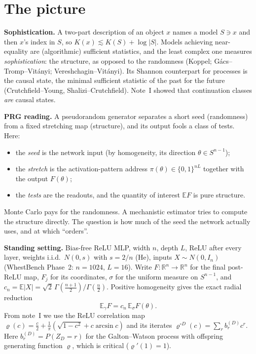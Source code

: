 \documentclass[11pt]{article}
\theoremstyle{definition}
\theoremstyle{remark}
\newcommand{\R}{\mathbb R}
\newcommand{\E}{\mathbb E}
\begin{document}
\tableofcontents

\section{The picture}\label{sec:picture}

\textbf{Sophistication.} A two-part description of an object $x$ names a model $S\ni x$ and then $x$'s index in $S$, so $K(x)\lesssim K(S)+\log|S|$. Models achieving near-equality are (algorithmic) sufficient statistics, and the least complex one measures \emph{sophistication}: the structure, as opposed to the randomness (Koppel; G\'acs--Tromp--Vit\'anyi; Vereshchagin--Vit\'anyi). Its Shannon counterpart for processes is the causal state, the minimal sufficient statistic of the past for the future (Crutchfield--Young, Shalizi--Crutchfield). Note~I showed that continuation classes \emph{are} causal states.

\textbf{PRG reading.} A pseudorandom generator separates a short seed (randomness) from a fixed stretching map (structure), and its output fools a class of tests. Here:
\begin{itemize}
\item the \emph{seed} is the network input (by homogeneity, its direction $\theta\in S^{n-1}$);
\item the \emph{stretch} is the activation-pattern address $\pi(\theta)\in\{0,1\}^{nL}$ together with the output $F(\theta)$;
\item the \emph{tests} are the readouts, and the quantity of interest $\E F$ is pure structure.
\end{itemize}
Monte Carlo pays for the randomness. A mechanistic estimator tries to compute the structure directly. The question is how much of the seed the network actually uses, and at which ``orders''.

\textbf{Standing setting.} Bias-free ReLU MLP, width $n$, depth $L$, ReLU after every layer, weights i.i.d.\ $N(0,s)$ with $s=2/n$ (He), inputs $X\sim N(0,I_n)$ (WhestBench Phase~2: $n=1024$, $L=16$). Write $F:\R^n\to\R^n$ for the final post-ReLU map, $F_j$ for its coordinates, $\sigma$ for the uniform measure on $S^{n-1}$, and $c_n=\E|X|=\sqrt2\,\Gamma(\tfrac{n+1}2)/\Gamma(\tfrac n2)$. Positive homogeneity gives the exact radial reduction
\begin{equation}\label{eq:radial}
\E_\gamma F=c_n\,\E_\sigma F(\theta).
\end{equation}
From note~I we use the ReLU correlation map $\varrho(c)=\frac c2+\frac1\pi(\sqrt{1-c^2}+c\arcsin c)$ and its iterates $\varrho^{\circ D}(c)=\sum_rb^{(D)}_rc^r$. Here $b^{(D)}_r=P(Z_D=r)$ for the Galton--Watson process with offspring generating function $\varrho$, which is critical ($\varrho'(1)=1$).
\end{document}

